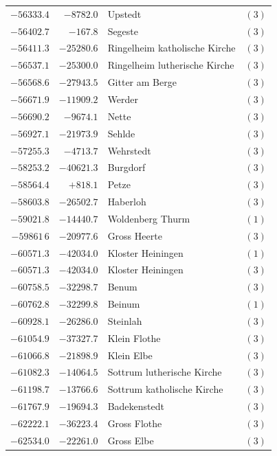 \begin{center}
\begin{tabular}{r|r|p{170pt}|r}
\(-56333.4\)&\(-8782.0\)&Upstedt&\((3)\)\\
\(-56402.7\)&\(-167.8\)&Segeste&\((3)\)\\
\(-56411.3\)&\(-25280.6\)&Ringelheim katholische Kirche&\((3)\)\\
\(-56537.1\)&\(-25300.0\)&Ringelheim lutherische Kirche&\((3)\)\\
\(-56568.6\)&\(-27943.5\)&Gitter am Berge&\((3)\)\\
\(-56671.9\)&\(-11909.2\)&Werder&\((3)\)\\
\(-56690.2\)&\(-9674.1\)&Nette&\((3)\)\\
\(-56927.1\)&\(-21973.9\)&Sehlde&\((3)\)\\
\(-57255.3\)&\(-4713.7\)&Wehrstedt&\((3)\)\\
\(-58253.2\)&\(-40621.3\)&Burgdorf&\((3)\)\\
\(-58564.4\)&\(+818.1\)&Petze&\((3)\)\\
\(-58603.8\)&\(-26502.7\)&Haberloh&\((3)\)\\
\(-59021.8\)&\(-14440.7\)&Woldenberg Thurm&\((1)\)\\
\(-59861\,6\)&\(-20977.6\)&Gross Heerte&\((3)\)\\
\(-60571.3\)&\(-42034.0\)&Kloster Heiningen&\((1)\)\\
\(-60571.3\)&\(-42034.0\)&Kloster Heiningen&\((3)\)\\
\(-60758.5\)&\(-32298.7\)&Benum&\((3)\)\\
\(-60762.8\)&\(-32299.8\)&Beinum&\((1)\)\\
\(-60928.1\)&\(-26286.0\)&Steinlah&\((3)\)\\
\(-61054.9\)&\(-37327.7\)&Klein Flothe&\((3)\)\\
\(-61066.8\)&\(-21898.9\)&Klein Elbe&\((3)\)\\
\(-61082.3\)&\(-14064.5\)&Sottrum lutherische Kirche&\((3)\)\\
\(-61198.7\)&\(-13766.6\)&Sottrum katholische Kirche&\((3)\)\\
\(-61767.9\)&\(-19694.3\)&Badekenstedt&\((3)\)\\
\(-62222.1\)&\(-36223.4\)&Gross Flothe&\((3)\)\\
\(-62534.0\)&\(-22261.0\)&Gross Elbe&\((3)\)\\
\hline\end{tabular}\endgroup\end{center}
